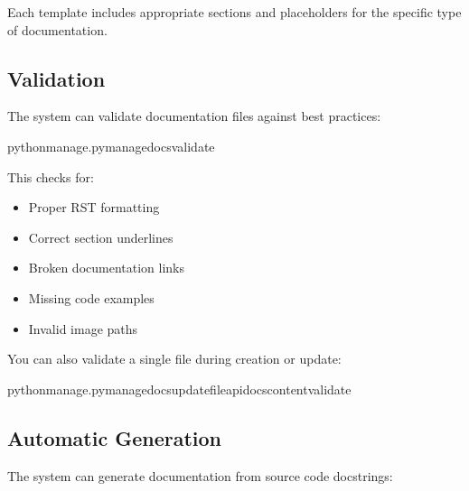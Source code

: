 \documentclass[letterpaper,10pt,english]{sphinxmanual}
\begin{document}
\sphinxAtStartPar
Each template includes appropriate sections and placeholders for the specific type of documentation.


\subsection{Validation}
\label{\detokenize{documentation_tools:validation}}
\sphinxAtStartPar
The system can validate documentation files against best practices:

\begin{sphinxVerbatim}[commandchars=\\\{\}]
pythonmanage.pymanage\PYGZus{}docsvalidate
\end{sphinxVerbatim}

\sphinxAtStartPar
This checks for:
\begin{itemize}
\item {} 
\sphinxAtStartPar
Proper RST formatting

\item {} 
\sphinxAtStartPar
Correct section underlines

\item {} 
\sphinxAtStartPar
Broken documentation links

\item {} 
\sphinxAtStartPar
Missing code examples

\item {} 
\sphinxAtStartPar
Invalid image paths

\end{itemize}

\sphinxAtStartPar
You can also validate a single file during creation or update:

\begin{sphinxVerbatim}[commandchars=\\\{\}]
pythonmanage.pymanage\PYGZus{}docsupdate\PYGZhy{}\PYGZhy{}fileapi\PYGZus{}docs\PYGZhy{}\PYGZhy{}content\PYGZhy{}\PYGZhy{}validate
\end{sphinxVerbatim}


\subsection{Automatic Generation}
\label{\detokenize{documentation_tools:automatic-generation}}
\sphinxAtStartPar
The system can generate documentation from source code docstrings:
\end{document}
